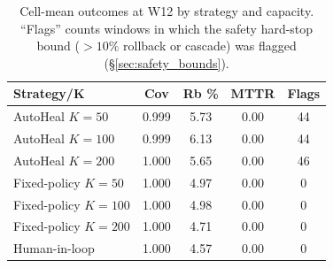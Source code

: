 \begin{table}[!t]
 \caption{Cell-mean outcomes at W12 by strategy and capacity.
 ``Flags'' counts windows in which the safety hard-stop bound
 ($>10\%$ rollback or cascade) was flagged
 (\S\ref{sec:safety_bounds}).}
 \label{tab:summary}
 \centering
 \small
 \setlength{\tabcolsep}{3pt}
 \begin{tabular}{@{}lcccc@{}}
 \toprule
 \textbf{Strategy/K} & \textbf{Cov} & \textbf{Rb \%} & \textbf{MTTR} & \textbf{Flags} \\
 \midrule
 AutoHeal $K{=}50$ & 0.999 & 5.73 & 0.00 & 44 \\
 AutoHeal $K{=}100$ & 0.999 & 6.13 & 0.00 & 44 \\
 AutoHeal $K{=}200$ & 1.000 & 5.65 & 0.00 & 46 \\
 Fixed-policy $K{=}50$ & 1.000 & 4.97 & 0.00 & 0 \\
 Fixed-policy $K{=}100$ & 1.000 & 4.98 & 0.00 & 0 \\
 Fixed-policy $K{=}200$ & 1.000 & 4.71 & 0.00 & 0 \\
 Human-in-loop & 1.000 & 4.57 & 0.00 & 0 \\
 \bottomrule
 \end{tabular}
\end{table}
